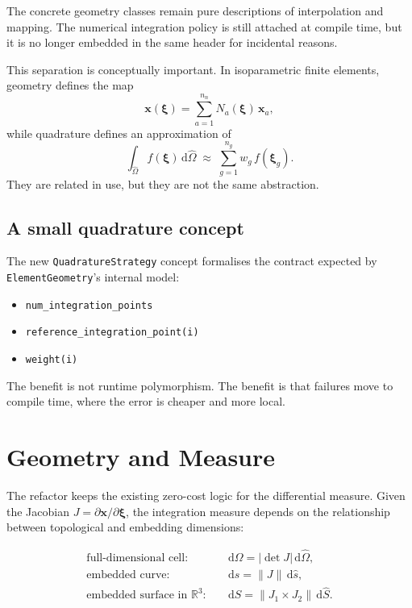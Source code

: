 The concrete geometry classes remain pure descriptions of interpolation and
mapping.  The numerical integration policy is still attached at compile time,
but it is no longer embedded in the same header for incidental reasons.

This separation is conceptually important.  In isoparametric finite elements,
geometry defines the map
\[
\mathbf{x}(\boldsymbol{\xi}) = \sum_{a=1}^{n_n} N_a(\boldsymbol{\xi})\,\mathbf{x}_a,
\]
while quadrature defines an approximation of
\[
\int_{\hat{\Omega}} f(\boldsymbol{\xi}) \,\mathrm{d}\hat{\Omega}
\;\approx\;
\sum_{g=1}^{n_g} w_g\,f(\boldsymbol{\xi}_g).
\]
They are related in use, but they are not the same abstraction.

\subsection{A small quadrature concept}

The new \texttt{QuadratureStrategy} concept formalises the contract expected by
\texttt{ElementGeometry}'s internal model:

\begin{itemize}[nosep]
  \item \texttt{num\_integration\_points}
  \item \texttt{reference\_integration\_point(i)}
  \item \texttt{weight(i)}
\end{itemize}

The benefit is not runtime polymorphism.  The benefit is that failures move to
compile time, where the error is cheaper and more local.


\section{Geometry and Measure}
\label{sec:eg_geometry_measure}

The refactor keeps the existing zero-cost logic for the differential measure.
Given the Jacobian \(J = \partial \mathbf{x} / \partial \boldsymbol{\xi}\), the
integration measure depends on the relationship between topological and
embedding dimensions:

\begin{align}
\text{full-dimensional cell:} \quad
& \mathrm{d}\Omega = |\det J|\,\mathrm{d}\hat{\Omega}, \\
\text{embedded curve:} \quad
& \mathrm{d}s = \lVert J \rVert\,\mathrm{d}\hat{s}, \\
\text{embedded surface in } \mathbb{R}^3: \quad
& \mathrm{d}S = \lVert J_1 \times J_2 \rVert\,\mathrm{d}\hat{S}.
\end{align}

